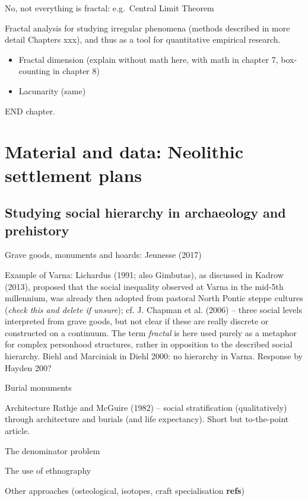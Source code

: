 \documentclass[
  12pt,
  a4paper, twoside]{book}
\begin{document}
No, not everything is fractal: e.g.~Central Limit Theorem

Fractal analysis for studying irregular phenomena (methods described in more detail Chapters xxx), and thus as a tool for quantitative empirical research.

\begin{itemize}
\item
  Fractal dimension (explain without math here, with math in chapter 7, box-counting in chapter 8)
\item
  Lacunarity (same)
\end{itemize}

END chapter.

\hypertarget{material}{%
\chapter{Material and data: Neolithic settlement plans}\label{material}}

\hypertarget{complexity-archaeo}{%
\section{Studying social hierarchy in archaeology and prehistory}\label{complexity-archaeo}}

Grave goods, monuments and hoards: Jeunesse (2017)

Example of Varna: Lichardus (1991; also Gimbutas), as discussed in Kadrow (2013), proposed that the social inequality observed at Varna in the mid-5th millennium, was already then adopted from pastoral North Pontic steppe cultures (\emph{check this and delete if unsure}); cf. J. Chapman et al. (2006) -- three social levels interpreted from grave goods, but not clear if these are really discrete or constructed on a continuum. The term \emph{fractal} is here used purely as a metaphor for complex personhood structures, rather in opposition to the described social hierarchy. Biehl and Marciniak in Diehl 2000: no hierarchy in Varna. Response by Hayden 200?

Burial monuments

Architecture Rathje and McGuire (1982) -- social stratification (qualitatively) through architecture and burials (and life expectancy). Short but to-the-point article.

The denominator problem

The use of ethnography

Other approaches (osteological, isotopes, craft specialisation \textbf{refs})
\end{document}
